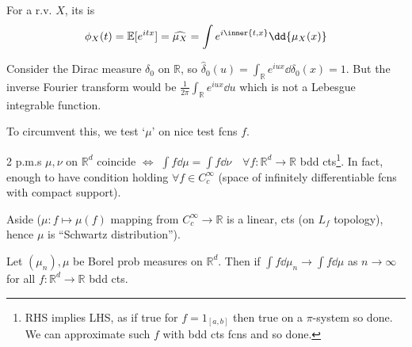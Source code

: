 \begin{definition}
	For a r.v. $X$, its  is
	\begin{align*}
		\phi_X(t) = \mathbb{E}[e^{itx}] = \widehat{\mu_X} = \int e^{i \inner{t, x}} \dd{\mu_X(x)}
	\end{align*}
\end{definition}

\begin{example}
	Consider the Dirac measure $\delta_0$ on $\mathbb R$, so $\hat \delta_0(u) = \int_{\mathbb R} e^{iux} \dd{\delta_0(x)} = 1$.
	But the inverse Fourier transform would be $\frac{1}{2\pi} \int_{\mathbb R} e^{iux} \dd{u}$ which is not a Lebesgue integrable function.
\end{example}

To circumvent this, we test `$\mu$' on nice test fcns $f$.

\begin{remark}
	2 p.m.s $\mu, \nu$ on $\mathbb{R}^d$ coincide $\iff$ $\int f \dd{\mu} = \int f \dd{\nu} \quad \forall f : \mathbb{R}^d \to \mathbb{R}$ bdd cts\footnote{RHS implies LHS, as if true for $f = 1_{[a, b]}$ then true on a $\pi$-system so done. We can approximate such $f$ with bdd cts fcns and so done.}.
	In fact, enough to have condition holding $\forall f \in C_c^\infty$ (space of infinitely differentiable fcns with compact support).
\end{remark}

\begin{aside}{Aside}
	($\mu : f \mapsto \mu(f)$ mapping from $C_c^\infty \to \mathbb{R}$ is a linear, cts (on $L_f$ topology), hence $\mu$ is ``Schwartz distribution'').

\end{aside}

\begin{definition}
	Let $(\mu_n), \mu$ be Borel prob measures on $\mathbb{R}^d$.
	Then  if $\int f \dd{\mu_n} \to \int f \dd{\mu}$ as $n \to \infty$ for all $f : \mathbb{R}^d \to \mathbb{R}$ bdd cts.
\end{definition}

